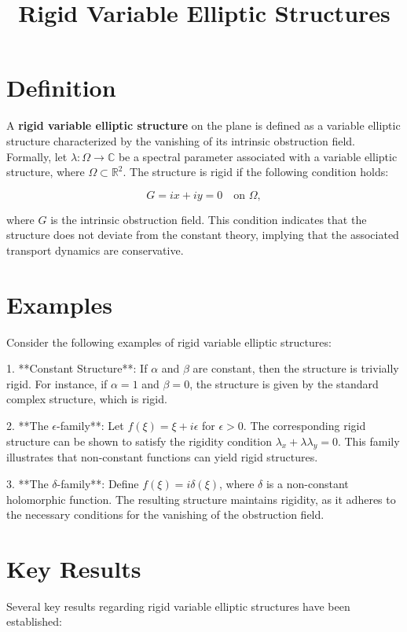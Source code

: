 \documentclass[11pt,a4paper]{article}
\title{Rigid Variable Elliptic Structures}
\date{}
\begin{document}
\maketitle
\section{Definition}
A \textbf{rigid variable elliptic structure} on the plane is defined as a variable elliptic structure characterized by the vanishing of its intrinsic obstruction field. Formally, let $\lambda: \Omega \to \mathbb{C}$ be a spectral parameter associated with a variable elliptic structure, where $\Omega \subset \mathbb{R}^2$. The structure is rigid if the following condition holds:

\begin{equation}
G = i x + i y = 0 \quad \text{on } \Omega,
\end{equation}

where $G$ is the intrinsic obstruction field. This condition indicates that the structure does not deviate from the constant theory, implying that the associated transport dynamics are conservative.

\section{Examples}
Consider the following examples of rigid variable elliptic structures:

1. **Constant Structure**: If $\alpha$ and $\beta$ are constant, then the structure is trivially rigid. For instance, if $\alpha = 1$ and $\beta = 0$, the structure is given by the standard complex structure, which is rigid.

2. **The $\epsilon$-family**: Let $f(\xi) = \xi + i\epsilon$ for $\epsilon > 0$. The corresponding rigid structure can be shown to satisfy the rigidity condition $\lambda_x + \lambda \lambda_y = 0$. This family illustrates that non-constant functions can yield rigid structures.

3. **The $\delta$-family**: Define $f(\xi) = i\delta(\xi)$, where $\delta$ is a non-constant holomorphic function. The resulting structure maintains rigidity, as it adheres to the necessary conditions for the vanishing of the obstruction field.

\section{Key Results}
Several key results regarding rigid variable elliptic structures have been established:
\end{document}
